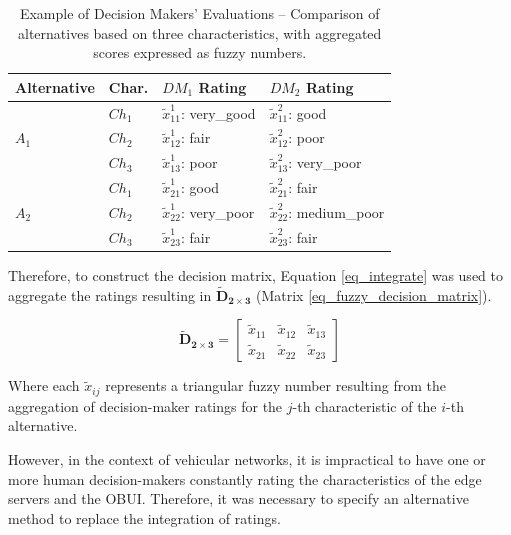 \documentclass[iicol]{sn-jnl}
\begin{document}
\begin{table}[!ht]
    \centering
    \caption{Example of Decision Makers' Evaluations – Comparison of alternatives based on three characteristics, with aggregated scores expressed as fuzzy numbers.
    }
    \label{tb_decision_makers}
    \begin{tabular}{llp{\fivecolumns}p{\fivecolumns}}
        \toprule
        \textbf{Alternative} & \textbf{Char.} & \textbf{$DM_1$ Rating} & \textbf{$DM_2$ Rating} \\
        \midrule
        \multirow{3}{*}{$A_1$}
        & $Ch_1$ &  $\tilde{x}_{11}^1$: very\_good & $\tilde{x}_{11}^2$: good \\
        & $Ch_2$ &  $\tilde{x}_{12}^1$: fair &  $\tilde{x}_{12}^2$: poor \\
        & $Ch_3$ & $\tilde{x}_{13}^1$: poor &  $\tilde{x}_{13}^2$: very\_poor \\
        \midrule
       \multirow{3}{*}{$A_2$}
        & $Ch_1$ &  $\tilde{x}_{21}^1$: good &  $\tilde{x}_{21}^2$: fair \\
        & $Ch_2$ & $\tilde{x}_{22}^1$: very\_poor &  $\tilde{x}_{22}^2$: medium\_poor \\
        & $Ch_3$ & $\tilde{x}_{23}^1$: fair & $\tilde{x}_{23}^2$: fair \\
        \bottomrule
    \end{tabular}
\end{table}

Therefore, to construct the decision matrix, Equation \eqref{eq_integrate} was used to aggregate the ratings resulting in $\mathbf{\tilde{D}_{2\times3}}$ (Matrix \eqref{eq_fuzzy_decision_matrix}).

\begin{equation}
    \label{eq_fuzzy_decision_matrix}
    \mathbf{\tilde{D}_{2\times3}} = 
    \begin{bmatrix}
        \tilde{x}_{11} & \tilde{x}_{12} & \tilde{x}_{13} \\
        \tilde{x}_{21} & \tilde{x}_{22} & \tilde{x}_{23}
    \end{bmatrix}
\end{equation}

Where each $\tilde{x}_{ij}$ represents a triangular fuzzy number resulting from the aggregation of decision-maker ratings for the $j$-th characteristic of the $i$-th alternative.

However, in the context of vehicular networks, it is impractical to have one or more human decision-makers constantly rating the characteristics of the edge servers and the OBUI. Therefore, it was necessary to specify an alternative method to replace the integration of ratings. 
\end{document}
